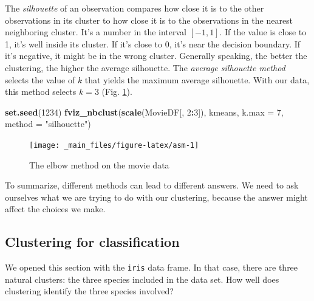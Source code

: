 \documentclass[
]{book}
\newenvironment{Shaded}{\begin{snugshade}}{\end{snugshade}}
\newcommand{\AttributeTok}[1]{\textcolor[rgb]{0.13,0.29,0.53}{#1}}
\newcommand{\DecValTok}[1]{\textcolor[rgb]{0.00,0.00,0.81}{#1}}
\newcommand{\FunctionTok}[1]{\textcolor[rgb]{0.13,0.29,0.53}{\textbf{#1}}}
\newcommand{\NormalTok}[1]{#1}
\newcommand{\OtherTok}[1]{\textcolor[rgb]{0.56,0.35,0.01}{#1}}
\newcommand{\SpecialCharTok}[1]{\textcolor[rgb]{0.81,0.36,0.00}{\textbf{#1}}}
\newcommand{\StringTok}[1]{\textcolor[rgb]{0.31,0.60,0.02}{#1}}
\theoremstyle{definition}
\theoremstyle{definition}
\theoremstyle{definition}
\theoremstyle{definition}
\theoremstyle{remark}
\begin{document}
The \emph{silhouette} of an observation compares how close it is to the other observations in its cluster to how close it is to the observations in the nearest neighboring cluster. It's a number in the interval \([-1,1]\). If the value is close to 1, it's well inside its cluster. If it's close to 0, it's near the decision boundary. If it's negative, it might be in the wrong cluster.
Generally speaking, the better the clustering, the higher the average silhouette. The \emph{average silhouette method} selects the value of \(k\) that yields the maximum average silhouette. With our data, this method selects \(k=3\) (Fig. \ref{fig:asm}).

\begin{Shaded}
\begin{Highlighting}[]
\FunctionTok{set.seed}\NormalTok{(}\DecValTok{1234}\NormalTok{)}
\FunctionTok{fviz\_nbclust}\NormalTok{(}\FunctionTok{scale}\NormalTok{(MovieDF[, }\DecValTok{2}\SpecialCharTok{:}\DecValTok{3}\NormalTok{]), kmeans, }\AttributeTok{k.max =} \DecValTok{7}\NormalTok{,  }
                \AttributeTok{method =} \StringTok{"silhouette"}\NormalTok{)}
\end{Highlighting}
\end{Shaded}

\begin{figure}

{\centering \texttt{[image: \_main\_files/figure-latex/asm-1]} 

}

\caption{The elbow method on the movie data}\label{fig:asm}
\end{figure}

To summarize, different methods can lead to different answers. We need to ask ourselves what we are trying to do with our clustering, because the answer might affect the choices we make.

\subsection*{Clustering for classification}\label{clustering-for-classification}

We opened this section with the \texttt{iris} data frame. In that case, there are three natural clusters: the three species included in the data set. How well does clustering identify the three species involved?

\begin{Shaded}
\end{Shaded}
\end{document}
